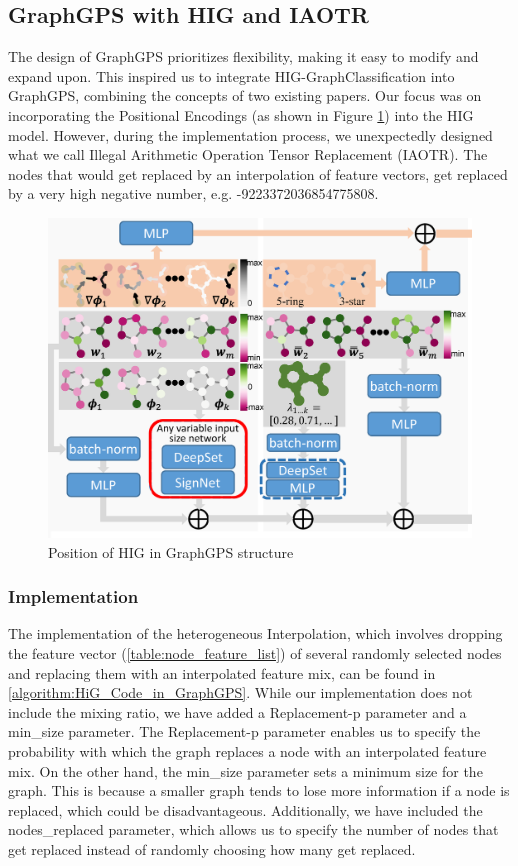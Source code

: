 \subsection{GraphGPS with HIG and IAOTR}
\label{sec:graphgps_hig}
The design of GraphGPS prioritizes flexibility, making it easy to modify and expand upon. This inspired us to integrate HIG-GraphClassification into GraphGPS, combining the concepts of two existing papers. Our focus was on incorporating the Positional Encodings (as shown in Figure \ref{fig:gps-hig-position}) into the HIG model. However, during the implementation process, we unexpectedly designed what we call Illegal Arithmetic Operation Tensor Replacement (IAOTR). The nodes that would get replaced by an interpolation of feature vectors, get replaced by a very high negative number, e.g. -9223372036854775808. 

\begin{figure}[!ht]
    \centering
    \includegraphics[scale=0.2]{tex/res/gps_hig_position.png}
    \caption{Position of HIG in GraphGPS structure}
    \label{fig:gps-hig-position}
\end{figure}

\subsubsection{Implementation}
The implementation of the heterogeneous Interpolation, which involves dropping the feature vector (\autoref{table:node_feature_list}) of several randomly selected nodes and replacing them with an interpolated feature mix, can be found in \autoref{algorithm:HiG_Code_in_GraphGPS}. While our implementation does not include the mixing ratio, we have added a Replacement-p parameter and a min\_size parameter. The Replacement-p parameter enables us to specify the probability with which the graph replaces a node with an interpolated feature mix. On the other hand, the min\_size parameter sets a minimum size for the graph. This is because a smaller graph tends to lose more information if a node is replaced, which could be disadvantageous. Additionally, we have included the nodes\_replaced parameter, which allows us to specify the number of nodes that get replaced instead of randomly choosing how many get replaced.

